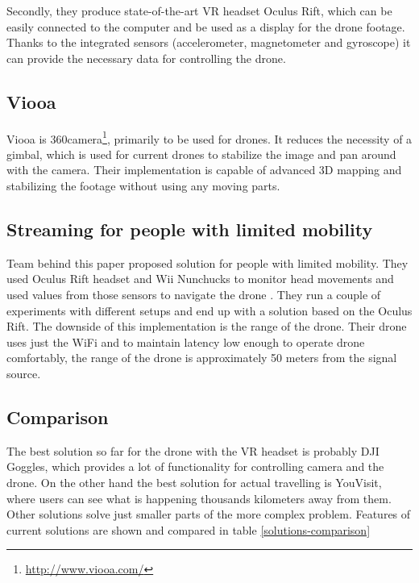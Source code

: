 Secondly, they produce state-of-the-art VR headset Oculus Rift, which can be easily connected to the computer and be used as a display for the drone footage. Thanks to the integrated sensors (accelerometer, magnetometer and gyroscope) it can provide the necessary data for controlling the drone.

\subsection{Viooa}
Viooa is 360\degree camera\footnote{\url{http://www.viooa.com/}}, primarily to be used for drones. It reduces the necessity of a gimbal, which is used for current drones to stabilize the image and pan around with the camera. Their implementation is capable of advanced 3D mapping and stabilizing the footage without using any moving parts.

\subsection{Streaming for people with limited mobility}
Team behind this paper proposed solution for people with limited mobility. They used Oculus Rift headset and Wii Nunchucks to monitor head movements and used values from those sensors to navigate the drone \cite{mangina2016drones}. They run a couple of experiments with different setups and end up with a solution based on the Oculus Rift. The downside of this implementation is the range of the drone. Their drone uses just the WiFi and to maintain latency low enough to operate drone comfortably, the range of the drone is approximately 50 meters from the signal source\cite{mangina2016drones}.

\subsection{Comparison}
The best solution so far for the drone with the VR headset is probably DJI Goggles, which provides a lot of functionality for controlling camera and the drone. On the other hand the best solution for actual travelling is YouVisit, where users can see what is happening thousands kilometers away from them. Other solutions solve just smaller parts of the more complex problem. Features of current solutions are shown and compared in table \ref{solutions-comparison}

